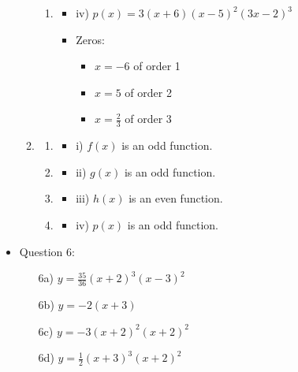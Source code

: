 \documentclass{article}
\begin{document}
\begin{itemize}
\begin{enumerate}
\begin{enumerate}
        \item 
        \begin{itemize}
            \item iv) $p(x) = 3(x + 6)(x - 5)^2(3x - 2)^3$
            \item Zeros:
                \begin{itemize}
                    \item $x = -6$ of order 1
                    \item $x = 5$ of order 2
                    \item $x = \frac{2}{3}$ of order 3
                \end{itemize}
        \end{itemize}
    \end{enumerate}
    
    \item 
    \begin{enumerate}
        \item 
        \begin{itemize}
            \item i) $f(x)$ is an odd function.
        \end{itemize}
        
        \item 
        \begin{itemize}
            \item ii) $g(x)$ is an odd function.
        \end{itemize}
        
        \item 
        \begin{itemize}
            \item iii) $h(x)$ is an even function.
        \end{itemize}
        
        \item 
        \begin{itemize}
            \item iv) $p(x)$ is an odd function.
        \end{itemize}
    \end{enumerate}
\end{enumerate}

\item Question 6:

\begin{enumerate}
    \item[6a)] $y = \frac{35}{36}(x + 2)^3(x - 3)^2$
    \item[6b)] $y=-2(x+3)$
    \item[6c)] $y=-3(x+2)^2(x+2)^2$ 
    \item[6d)] $y=\frac{1}{2}(x+3)^3(x+2)^2$ 
\end{enumerate}
\newpage


\end{itemize}
\end{document}
